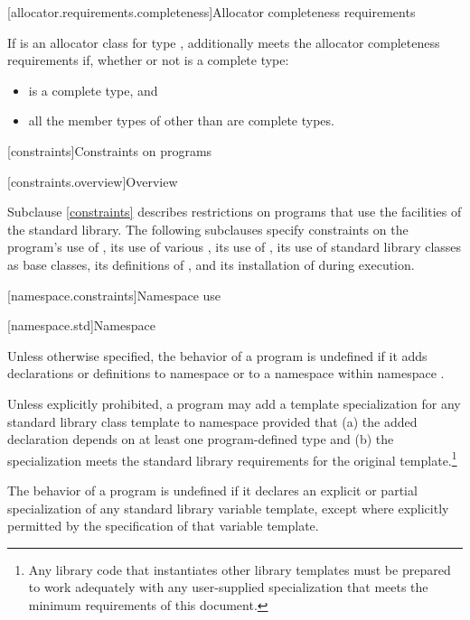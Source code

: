 [allocator.requirements.completeness]{Allocator completeness requirements}

\pnum
If  is an allocator class for type ,
 additionally meets the allocator completeness requirements if,
whether or not  is a complete type:
\begin{itemize}
\item {} is a complete type, and
\item all the member types of 
  other than  are complete types.
\end{itemize}

[constraints]{Constraints on programs}

[constraints.overview]{Overview}

\pnum
Subclause \ref{constraints} describes restrictions on \Cpp{} programs that use the facilities of
the \Cpp{} standard library. The following subclauses specify constraints on the
program's use of , its use of various , its use of , its use of
standard library classes as base classes, its
definitions of , and its
installation of  during execution.

[namespace.constraints]{Namespace use}

[namespace.std]{Namespace }

\pnum
Unless otherwise specified,
the behavior of a \Cpp{} program is undefined if it adds declarations or definitions to namespace
or to a namespace within namespace
.

\pnum
Unless explicitly prohibited,
a program may add a template specialization for
any standard library class template
to namespace
 provided that
(a) the added declaration
depends on at least one program-defined type
and
(b) the specialization meets the standard library requirements
for the original template.\footnote{Any
library code that instantiates other library templates
must be prepared to work adequately with any user-supplied specialization
that meets the minimum requirements of this document.}

\pnum
The behavior of a \Cpp{} program is undefined
if it declares an explicit or partial specialization
of any standard library variable template,
except where explicitly permitted by the specification of that variable template.

